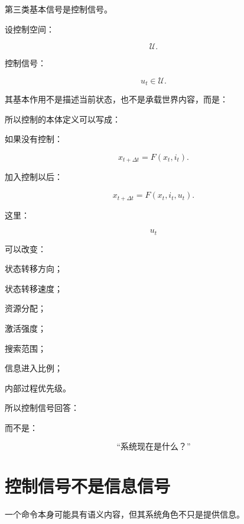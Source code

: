 第三类基本信号是控制信号。

设控制空间：

\[
\mathcal U.
\]

控制信号：

\[
u_t\in\mathcal U.
\]

其基本作用不是描述当前状态，也不是承载世界内容，而是：

\begin{statementbox}
\centering
{}
\end{statementbox}

所以控制的本体定义可以写成：

\begin{statementbox}
\centering
{}
\end{statementbox}

如果没有控制：

\[
x_{t+\Delta t}
=
F(x_t,i_t).
\]

加入控制以后：

\[
\boxed{
x_{t+\Delta t}
=
F(x_t,i_t,u_t).
}
\]

这里：

\[
u_t
\]

可以改变：

状态转移方向；

状态转移速度；

资源分配；

激活强度；

搜索范围；

信息进入比例；

内部过程优先级。

所以控制信号回答：

\begin{statementbox}
\centering
{}
\end{statementbox}

而不是：

\[
\text{“系统现在是什么？”}
\]

\section{控制信号不是信息信号}

一个命令本身可能具有语义内容，但其系统角色不只是提供信息。

